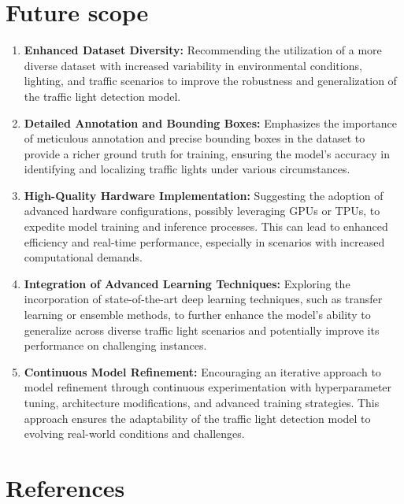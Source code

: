 \documentclass[12 pt]{report}
\begin{document}
\begin{flushleft}
\end{flushleft}
\newpage
\section{Future scope}
\begin{justify}
\begin{enumerate}
    \item \textbf{Enhanced Dataset Diversity:}
    Recommending the utilization of a more diverse dataset with increased variability in environmental conditions, lighting, and traffic scenarios to improve the robustness and generalization of the traffic light detection model.
    \item \textbf{Detailed Annotation and Bounding Boxes:}
    Emphasizes the importance of meticulous annotation and precise bounding boxes in the dataset to provide a richer ground truth for training, ensuring the model's accuracy in identifying and localizing traffic lights under various circumstances.
    \item \textbf{High-Quality Hardware Implementation:}
    Suggesting the adoption of advanced hardware configurations, possibly leveraging GPUs or TPUs, to expedite model training and inference processes. This can lead to enhanced efficiency and real-time performance, especially in scenarios with increased computational demands.
    \item \textbf{Integration of Advanced Learning Techniques:}
    Exploring the incorporation of state-of-the-art deep learning techniques, such as transfer learning or ensemble methods, to further enhance the model's ability to generalize across diverse traffic light scenarios and potentially improve its performance on challenging instances.
    \item \textbf{Continuous Model Refinement:}
    Encouraging an iterative approach to model refinement through continuous experimentation with hyperparameter tuning, architecture modifications, and advanced training strategies. This approach ensures the adaptability of the traffic light detection model to evolving real-world conditions and challenges.
\end{enumerate}
\end{justify}
\newpage
\section*{References}
\end{document}
